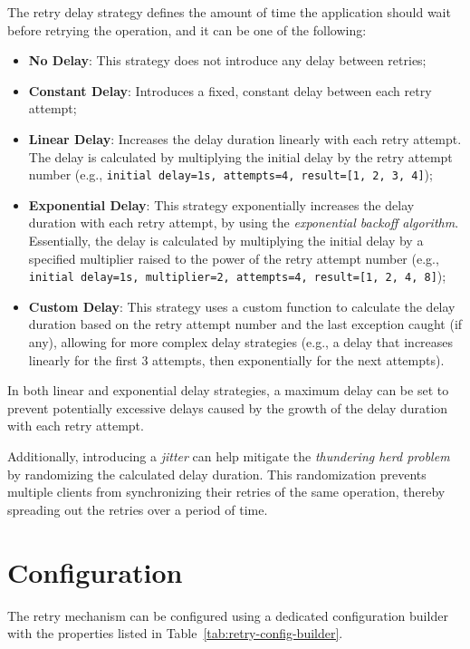 The retry delay strategy defines the amount of time the application should wait before retrying the operation, and it can be one of the following:

\begin{itemize}
    \item \textbf{No Delay}: This strategy does not introduce any delay between retries;
    \item \textbf{Constant Delay}: Introduces a fixed, constant delay between each retry attempt;
    \item \textbf{Linear Delay}: Increases the delay duration linearly with each retry attempt.
    The delay is calculated by multiplying the initial delay by the retry attempt number
    (e.g., \texttt{initial delay=1s, attempts=4, result=[1, 2, 3, 4]});
    \item \textbf{Exponential Delay}: This strategy exponentially increases the delay duration with each retry attempt,
    by using the \textit{exponential backoff algorithm}.
    Essentially, the delay is calculated by multiplying the initial delay by a specified multiplier raised to the power of the retry attempt number (e.g., \texttt{initial delay=1s, multiplier=2, attempts=4, result=[1, 2, 4, 8]});
    \item \textbf{Custom Delay}: This strategy uses a custom function to calculate the delay duration based on the retry attempt number and the last exception caught (if any), allowing for more complex delay strategies (e.g., a delay that increases linearly for the first 3 attempts, then exponentially for the next attempts).
\end{itemize}

In both linear and exponential delay strategies,
a maximum delay can be set
to prevent potentially excessive delays caused by the growth of the delay duration with each retry attempt.

Additionally,
introducing a \textit{jitter} can help
mitigate the \textit{thundering herd problem} by randomizing the calculated delay duration.
This randomization prevents multiple clients from synchronizing their retries of the same operation,
thereby spreading out the retries over a period of time.


\section{Configuration}\label{sec:retry-configuration}

The retry mechanism can be configured
using a dedicated configuration builder with the properties listed in Table~\ref{tab:retry-config-builder}.

